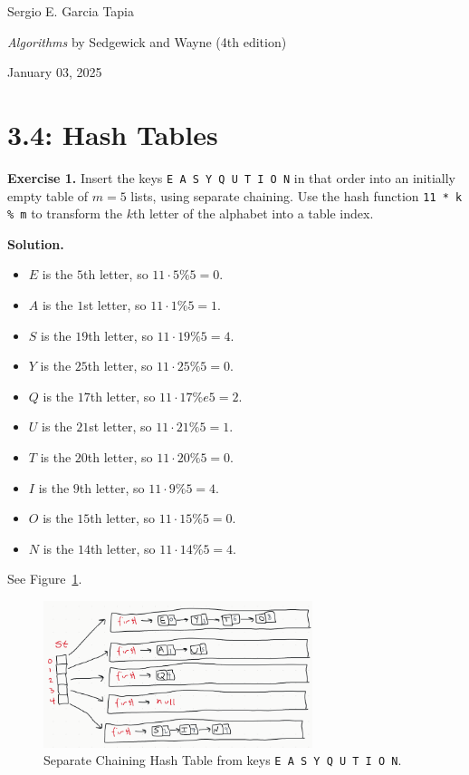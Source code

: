 \documentclass[12pt, a4paper]{article}
\newenvironment{ex}[2][Exercise]
{\par\medskip\noindent \textbf{#1 #2.}}
{\medskip}
\newenvironment{sol}[1][Solution]
{\par\medskip\noindent \textbf{#1.} }
{\medskip}
\begin{document}
	\noindent Sergio E. Garcia Tapia \hfill
	
	\noindent \emph{Algorithms} by Sedgewick and Wayne (4th edition) \cite{sedgewick_wayne}\hfill
	
	\noindent January 03, 2025\hfill 
	\section*{3.4: Hash Tables}
	\begin{ex}{1}
		Insert the keys \texttt{E A S Y Q U T I O N} in that order into an initially empty
		table of $m=5$ lists, using separate chaining. Use the hash function \texttt{11 * k \% m}
		to transform the $k$th letter of the alphabet into a table index.
	\end{ex}
	\begin{sol}
		\begin{itemize}
			\item $E$ is the $5$th letter, so $11\cdot 5 \% 5 = 0$.
			\item $A$ is the $1$st letter, so $11\cdot 1 \% 5 = 1$.
			\item $S$ is the $19$th letter, so $11\cdot 19 \% 5 = 4$.
			\item $Y$ is the $25$th letter, so $11\cdot 25 \% 5 = 0$.
			\item $Q$ is the $17$th letter, so $11\cdot 17 \% e5 = 2$.
			\item $U$ is the $21$st letter, so $11\cdot 21 \% 5 = 1$.
			\item $T$ is the $20$th letter, so $11\cdot 20 \% 5 = 0$.
			\item $I$ is the $9$th letter, so $11\cdot 9 \% 5 = 4$.
			\item $O$ is the $15$th letter, so $11\cdot 15 \% 5 = 0$.
			\item $N$ is the $14$th letter, so $11\cdot 14 \% 5 = 4$.
		\end{itemize}
		See Figure~\ref{fig:ex-01}.
		\begin{figure}
			\centering
			\includegraphics[width=0.7\textwidth]{exercise-01}
			\caption{Separate Chaining Hash Table from keys \texttt{E A S Y Q U T I O N}.}
			\label{fig:ex-01}
		\end{figure}
	\end{sol}
	
	\pagebreak
	\printbibliography
\end{document}

